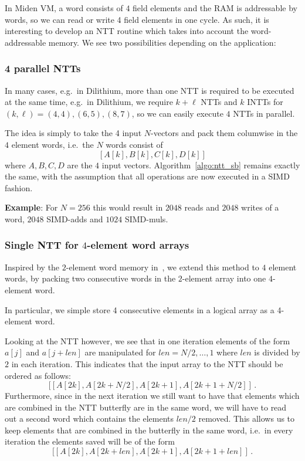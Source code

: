 In Miden VM, a word consists of $4$ field elements and the RAM is addressable by words, so we can read or write 4 field
elements in one cycle.  As such, it is interesting to develop an NTT routine which takes into account the word-addressable
memory.   We see two possibilities depending on the application:

\subsubsection{4 parallel NTTs}

In many cases, e.g.\ in Dilithium, more than one NTT is required to be executed at the same time, e.g.\
in Dilithium, we require $k + \ell$ NTTs and $k$ INTTs for $(k,\ell) = (4,4), (6,5), (8,7)$, so we can 
easily execute $4$ NTTs in parallel.

The idea is simply to take the 4 input $N$-vectors and pack them columwise in the $4$ element words, i.e.\
the $N$ words consist of 
\[ [A[k], B[k], C[k], D[k]] \]
where $A,B,C,D$ are the $4$ input vectors.    Algorithm~\ref{algo:ntt_sb} remains exactly the same, with the assumption that
all operations are now executed in a SIMD fashion.

\textbf{Example}: For $N = 256$ this would result in $2048$ reads and $2048$ writes of a word, $2048$ SIMD-adds and $1024$ SIMD-muls.

\subsubsection{Single NTT for $4$-element word arrays}

Inspired by the $2$-element word memory in~\cite{}, we extend this method to $4$ element words, by packing 
two consecutive words in the $2$-element array into one $4$-element word.

In particular, we simple store 4 consecutive elements in a logical array as a 4-element word.

Looking at the NTT however, we see that in one iteration elements of the form $a[j]$ and $a[j+len]$
are manipulated for $len = N/2, \ldots, 1$ where $len$ is divided by $2$ in each iteration.  This indicates that
the input array to the NTT should be ordered as follows:
\[ [  [A[2k], A[2k+N/2], A[2k+1], A[2k +1 + N/2]  ] \, . \]
Furthermore, since in the next iteration we still want to have that elements which are combined in 
the NTT butterfly are in the same word, we will have to read out a second word which contains the
elements $len/2$ removed.  This allows us to keep elements that are combined in the butterfly in 
the same word, i.e.\ in every iteration the elements saved will be of the form
\[ [  [A[2k], A[2k+len], A[2k+1], A[2k +1 + len]  ] \, . \]

